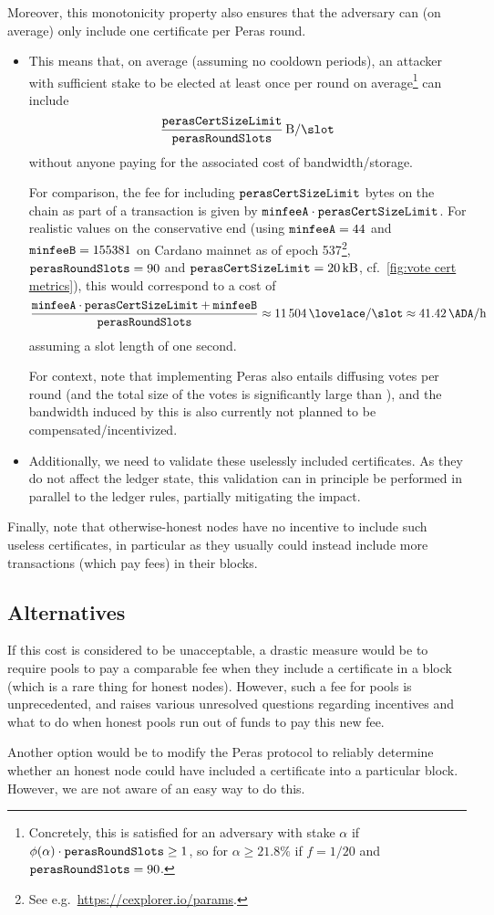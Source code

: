 Moreover, this monotonicity property also ensures that the adversary can (on average) only include one certificate per Peras round.
\begin{itemize}
\item
  This means that, on average (assuming no cooldown periods), an attacker with sufficient stake to be elected at least once per round on average\footnote{Concretely, this is satisfied for an adversary with stake $\alpha$ if $\phi(\alpha)\cdot\mathtt{perasRoundSlots} \ge 1$, so for $\alpha \ge 21.8\%$ if $f=1/20$ and $\mathtt{perasRoundSlots}=90$.} can include
  \[\frac \perasCertSizeLimit \perasRoundSlots\,\unit{B/\slot}\]
  without anyone paying for the associated cost of bandwidth/storage.

  For comparison, the fee for including $\mathtt{perasCertSizeLimit}$ bytes on the chain as part of a transaction is given by $\mathtt{minfeeA}\cdot \mathtt{perasCertSizeLimit}$.
  For realistic values on the conservative end (using $\mathtt{minfeeA} = 44$ and $\mathtt{minfeeB} = 155381$ on Cardano mainnet as of epoch 537\footnote{See e.g.\ \url{https://cexplorer.io/params}.}, $\mathtt{perasRoundSlots}=90$ and $\mathtt{perasCertSizeLimit} = \SI{20}{kB}$, cf.~\cref{fig:vote cert metrics}), this would correspond to a cost of
  \[ \frac{\mi{minfeeA\cdot \perasCertSizeLimit + \mi{minfeeB}}}{\perasRoundSlots} \approx \SI{11504}{\lovelace/\slot} \approx \SI{41.42}{\ADA/h} \]
  assuming a slot length of one second.

  For context, note that implementing Peras also entails diffusing \perasN{} votes per round (and the total size of the votes is significantly large than \perasCertSizeLimit{}), and the bandwidth induced by this is also currently not planned to be compensated/incentivized.
\item
  Additionally, we need to validate these uselessly included certificates.
  As they do not affect the ledger state, this validation can in principle be performed in parallel to the ledger rules, partially mitigating the impact.
\end{itemize}
Finally, note that otherwise-honest nodes have no incentive to include such useless certificates, in particular as they usually could instead include more transactions (which pay fees) in their blocks.

\subsection{Alternatives}
If this cost is considered to be unacceptable, a drastic measure would be to require pools to pay a comparable fee when they include a certificate in a block (which is a rare thing for honest nodes).
However, such a fee for pools is unprecedented, and raises various unresolved questions regarding incentives and what to do when honest pools run out of funds to pay this new fee.

Another option would be to modify the Peras protocol to reliably determine whether an honest node could have included a certificate into a particular block.
However, we are not aware of an easy way to do this.


